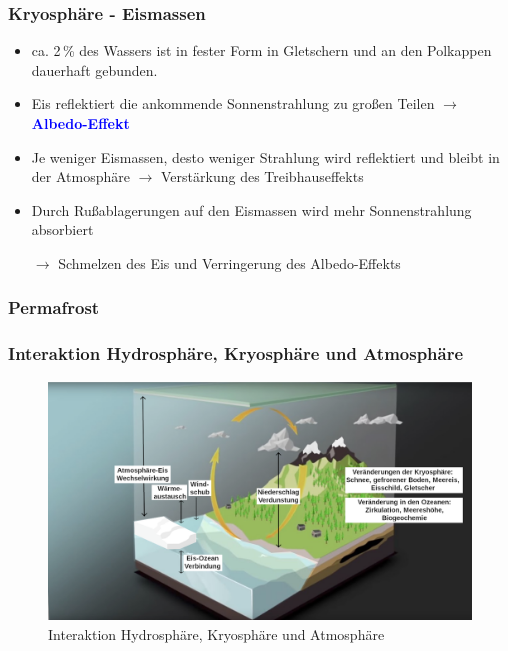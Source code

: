 \begin{frame}
	\frametitle{Kryosphäre - Eismassen} %
	\begin{itemize}
		\item ca. 2\,\% des Wassers ist in fester Form in Gletschern und an den Polkappen dauerhaft gebunden.
		\item Eis reflektiert die ankommende Sonnenstrahlung zu großen Teilen
		$\rightarrow$ \textbf{\textcolor{blue}{Albedo-Effekt}}\\
		
		\item Je weniger Eismassen, desto weniger Strahlung wird reflektiert und bleibt in der Atmosphäre $\rightarrow$ Verstärkung des Treibhauseffekts
		
		\item Durch Rußablagerungen auf den Eismassen wird mehr Sonnenstrahlung absorbiert 
		\item [$\rightarrow$] Schmelzen des Eis und Verringerung des Albedo-Effekts %
	\end{itemize}
	
\end{frame}

\begin{frame}
	\frametitle{Permafrost}
\end{frame}

\begin{frame}
	\frametitle{Interaktion Hydrosphäre, Kryosphäre und Atmosphäre}
	\begin{figure}
		\centering
		\includegraphics{bilder/WMO_Cycles_factors_waterAndIce.png}
		\caption{Interaktion Hydrosphäre, Kryosphäre und Atmosphäre}
	\end{figure}
\end{frame}

